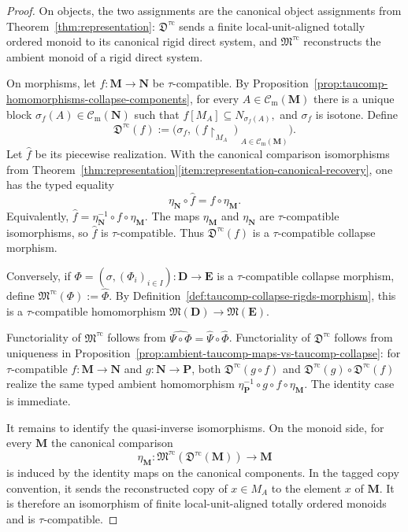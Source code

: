 \documentclass[pdflatex,sn-mathphys-num]{sn-jnl}
\theoremstyle{thmstyleone}%
\theoremstyle{thmstyletwo}%
\theoremstyle{thmstylethree}%
\newcommand{\Cm}{\mathcal C_{\mathrm m}}
\begin{document}
\begin{proof}
On objects, the two assignments are the canonical object assignments from Theorem~\ref{thm:representation}: \(\mathfrak D^{\tau\mathrm{c}}\) sends a finite local-unit-aligned totally ordered monoid to its canonical rigid direct system, and \(\mathfrak M^{\tau\mathrm{c}}\) reconstructs the ambient monoid of a rigid direct system.

On morphisms, let \(f\colon\mathbf M\to\mathbf N\) be \(\tau\)-compatible.
By Proposition~\ref{prop:taucomp-homomorphisms-collapse-components}, for every \(A\in\Cm(\mathbf M)\) there is a unique block \(\sigma_f(A)\in\Cm(\mathbf N)\) such that \(f[M_A]\subseteq N_{\sigma_f(A)},\) and \(\sigma_f\) is isotone.
Define
\[
\mathfrak D^{\tau\mathrm{c}}(f)
:=
\bigl(\sigma_f,(f\!\upharpoonright_{M_A})_{A\in\Cm(\mathbf M)}\bigr).
\]
Let \(\widehat f\) be its piecewise realization.
With the canonical comparison isomorphisms from Theorem~\ref{thm:representation}\ref{item:representation-canonical-recovery}, one has the typed equality
\[
\eta_{\mathbf N}\circ \widehat f=f\circ \eta_{\mathbf M}.
\]
Equivalently, \(\widehat f=\eta_{\mathbf N}^{-1}\circ f\circ\eta_{\mathbf M}\).
The maps \(\eta_{\mathbf M}\) and \(\eta_{\mathbf N}\) are \(\tau\)-compatible isomorphisms, so \(\widehat f\) is \(\tau\)-compatible.
Thus \(\mathfrak D^{\tau\mathrm{c}}(f)\) is a \(\tau\)-compatible collapse morphism.

Conversely, if \(\Phi=(\sigma,(\Phi_i)_{i\in I})\colon\mathbf D\to\mathbf E\) is a \(\tau\)-compatible collapse morphism, define \(\mathfrak M^{\tau\mathrm{c}}(\Phi):=\widehat\Phi.\)
By Definition~\ref{def:taucomp-collapse-rigds-morphism}, this is a \(\tau\)-compatible homomorphism \(\mathfrak M(\mathbf D)\to\mathfrak M(\mathbf E).\)

Functoriality of \(\mathfrak M^{\tau\mathrm{c}}\) follows from \(\widehat{\Psi\circ\Phi}=\widehat\Psi\circ\widehat\Phi\).
Functoriality of \(\mathfrak D^{\tau\mathrm{c}}\) follows from uniqueness in Proposition~\ref{prop:ambient-taucomp-maps-vs-taucomp-collapse}: for \(\tau\)-compatible \(f\colon\mathbf M\to\mathbf N\) and \(g\colon\mathbf N\to\mathbf P\), both \(\mathfrak D^{\tau\mathrm{c}}(g\circ f)\) and \(\mathfrak D^{\tau\mathrm{c}}(g)\circ\mathfrak D^{\tau\mathrm{c}}(f)\) realize the same typed ambient homomorphism \(\eta_{\mathbf P}^{-1}\circ g\circ f\circ\eta_{\mathbf M}\).
The identity case is immediate.

It remains to identify the quasi-inverse isomorphisms.
On the monoid side, for every \(\mathbf M\) the canonical comparison
\[
\eta_{\mathbf M}\colon
\mathfrak M^{\tau\mathrm{c}}(\mathfrak D^{\tau\mathrm{c}}(\mathbf M))
\longrightarrow
\mathbf M
\]
is induced by the identity maps on the canonical components.
In the tagged copy convention, it sends the reconstructed copy of \(x\in M_A\) to the element \(x\) of \(\mathbf M\).
It is therefore an isomorphism of finite local-unit-aligned totally ordered monoids and is \(\tau\)-compatible.


\end{proof}
\end{document}
